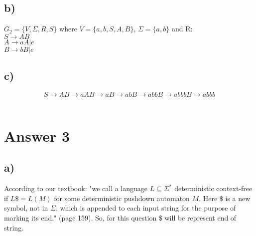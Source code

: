 \documentclass[12pt]{article}
\begin{document}
\subsection*{b)}
$G_2 = \{V, \Sigma, R, S\}$ where $V = \{a,b,S,A,B\}$, $\Sigma =  \{a,b\}$ and R: \\
$ S \rightarrow AB$ \\ 
$ A \rightarrow aA | e$ \\ 
$ B \rightarrow bB | e$ 
\subsection*{c)}
$$S \rightarrow AB \rightarrow  aAB \rightarrow aB \rightarrow  abB \rightarrow abbB \rightarrow abbbB \rightarrow abbb$$
\\
\begin{center}
\end{center}

\section*{Answer 3}
\subsection*{a)}
According to our textbook: "we call a language $L \subseteq \Sigma^*$ deterministic context-free if $L\$ = L(M)$ for some deterministic pushdown automaton $M$. Here \$ is a new symbol, not in $\Sigma$, which is appended to each input string for the purpose of marking its end."   (page 159). So, for this question \$ will be represent end of string. 
\end{document}
